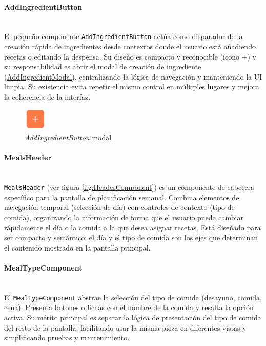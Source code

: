 \documentclass[twoside, openright, 11pt]{report}
\begin{document}
				\paragraph{AddIngredientButton\\\\}
					El pequeño componente \texttt{AddIngredientButton} actúa como disparador de la creación rápida de ingredientes desde contextos donde el usuario está añadiendo recetas o editando la despensa. Su diseño es compacto y reconocible (icono +) y su responsabilidad es abrir el modal de creación de ingrediente (\hyperref[AddIngredientModal]{AddIngredientModal}), centralizando la lógica de navegación y manteniendo la UI limpia. Su existencia evita repetir el mismo control en múltiples lugares y mejora la coherencia de la interfaz.
						
					\begin{figure}[H]
						\centering
						\includegraphics{imagenes/AddIngredientButton.png}
						\caption{\textit{AddIngredientButton} modal}
						\label{fig:AddIngredientButton}
					\end{figure}

				\paragraph{MealsHeader\\\\}
					\texttt{MealsHeader} (ver figura \ref{fig:HeaderComponent}) es un componente de cabecera específico para la pantalla de planificación semanal. Combina elementos de navegación temporal (selección de día) con controles de contexto (tipo de comida), organizando la información de forma que el usuario pueda cambiar rápidamente el día o la comida a la que desea asignar recetas. Está diseñado para ser compacto y semántico: el día y el tipo de comida son los ejes que determinan el contenido mostrado en la pantalla principal.
						

				\paragraph{MealTypeComponent\\\\} \label{MealTypeComponent}
				El \texttt{MealTypeComponent} abstrae la selección del tipo de comida (desayuno, comida, cena). Presenta botones o fichas con el nombre de la comida y resalta la opción activa. Su mérito principal es separar la lógica de presentación del tipo de comida del resto de la pantalla, facilitando usar la misma pieza en diferentes vistas y simplificando pruebas y mantenimiento.
						
\end{document}
